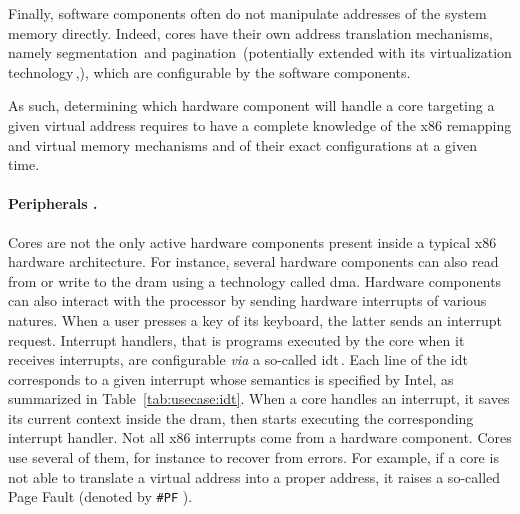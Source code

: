 Finally, software components often do not manipulate addresses of the system memory
directly.
%
Indeed, cores have their own address translation mechanisms, namely
segmentation\,\cite[Volume 3, Section 2.4]{intel2014manual} and
pagination\,\cite[Volume 3, Chapter 4]{intel2014manual} (potentially extended
with its virtualization technology\,\cite[Volume 3, Section
28.2]{intel2014manual},), which are configurable by the software components.

As such, determining which hardware component will handle a core \IO targeting a
given virtual address requires to have a complete knowledge of the x86 remapping
and virtual memory mechanisms and of their exact configurations at a given time.

\paragraph{Peripherals \IOs.}
%
Cores are not the only active hardware components present inside a typical x86
hardware architecture.
%
For instance, several hardware components can also read from or write to the
\ac{dram} using a technology called \ac{dma}.
%
Hardware components can also interact with the processor by sending hardware
interrupts of various natures.
%
When a user presses a key of its keyboard, the latter sends an interrupt
request.
%
Interrupt handlers, that is programs executed by the core when it receives
interrupts, are configurable \emph{via} a so-called \ac{idt}\,\cite[Volume 3,
Chapter 6]{intel2014manual}.
%
Each line of the \ac{idt} corresponds to a given interrupt whose semantics is
specified by Intel, as summarized in Table~\ref{tab:usecase:idt}.
%
When a core handles an interrupt, it saves its current context inside the
\ac{dram}, then starts executing the corresponding interrupt handler.
%
Not all x86 interrupts come from a hardware component.
%
Cores use several of them, for instance to recover from errors.
%
For example, if a core is not able to translate a virtual address into a proper
address, it raises a so-called Page Fault (denoted by \texttt{\#PF} ).

